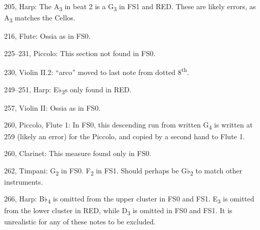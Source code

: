\documentclass[twoside]{article}
\begin{document}
\begin{hangparas}{15pt}{1}
\begin{multicols}{2}
205, Harp: The A\textsubscript{3} in beat 2 is a G\textsubscript{3} in FS1 and RED. These are likely errors, as A\textsubscript{3} matches the Cellos.

216, Flute: Ossia as in FS0.

225--231, Piccolo: This section not found in FS0.

230, Violin II.2: ``arco'' moved to last note from dotted 8\textsuperscript{th}.

249--251, Harp: E♭\textsubscript{3}s only found in RED.

257, Violin II: Ossia as in FS0.

260, Piccolo, Flute 1: In FS0, this descending run from written G\textsubscript{4} is written at 259 (likely an error) for the Piccolo, and copied by a second hand to Flute 1.

260, Clarinet: This measure found only in FS0.

262, Timpani: G\textsubscript{2} in FS0. F\textsubscript{2} in FS1. Should perhaps be G♭\textsubscript{2} to match other instruments.

266, Harp: B♭\textsubscript{4} is omitted from the upper cluster in FS0 and FS1. E\textsubscript{3} is omitted from the lower cluster in RED, while D\textsubscript{3} is omitted in FS0 and FS1. It is unrealistic for any of these notes to be excluded.

\end{multicols}

\end{hangparas}
\end{document}
